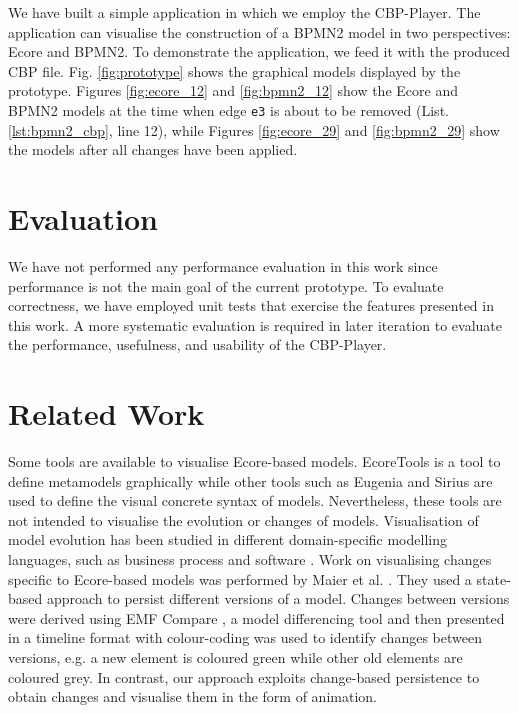 \documentclass[conference]{IEEEtran}
\begin{document}
We have built a simple application in which we employ the CBP-Player. 
The application can visualise the construction of a BPMN2 model in two perspectives: Ecore and BPMN2. 
To demonstrate the application, we feed it with the produced CBP file. 
Fig. \ref{fig:prototype} shows the graphical models displayed by the prototype. 
Figures \ref{fig:ecore_12} and \ref{fig:bpmn2_12} show the Ecore and BPMN2 models at the time when edge \texttt{e3} 
is about to be removed (List. \ref{lst:bpmn2_cbp}, line 12), while 
Figures \ref{fig:ecore_29} and \ref{fig:bpmn2_29} show the models after all changes have been applied.

\section{Evaluation}
\label{sec:evaluation}
We have not performed any performance evaluation in this work 
since performance is not the main goal of the current prototype.
To evaluate correctness, we have employed unit tests that exercise the features 
presented in this work. A more systematic evaluation is required in later iteration 
to evaluate the performance, usefulness, and usability of the CBP-Player.

\section{Related Work}
\label{sec:related_work}
Some tools are available to visualise Ecore-based models. 
EcoreTools \cite{eclipse2019ecoretools} is a tool to define metamodels graphically while other tools such as
Eugenia \cite{Kolovos2017} and Sirius \cite{eclipse2019sirius} are used 
to define the visual concrete syntax of models.
Nevertheless, these tools are not intended to visualise the evolution or changes of models. 
Visualisation of model evolution has been studied in different domain-specific
modelling languages, such as business process \cite{fritscher2014visualizing}
and software \cite{Mattila:2016:SVT:2994310.2994327}. Work on visualising changes specific to Ecore-based models 
was performed by Maier et al. \cite{maier2015recording}. 
They used a state-based approach to persist different versions of a model.
Changes between versions were derived using EMF Compare \cite{eclipse2017compare}, 
a model differencing tool and then presented 
in a timeline format with colour-coding was used 
to identify changes between versions, e.g. a new element is coloured green
while other old elements are coloured grey. In contrast, our approach
exploits change-based persistence to obtain changes and visualise them in
the form of animation.
\end{document}
